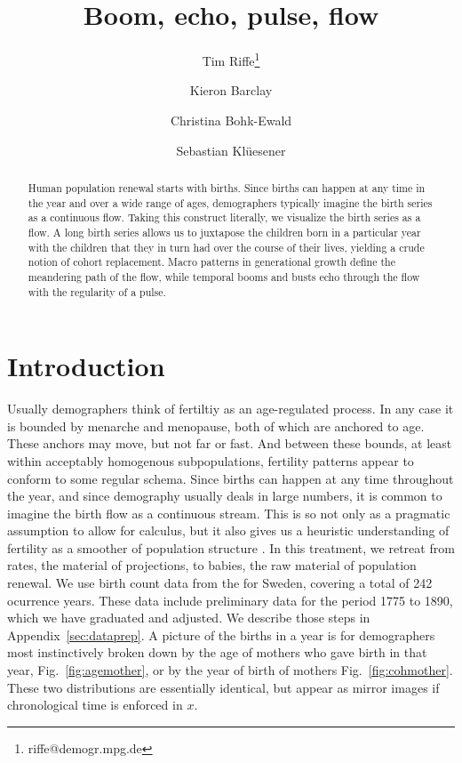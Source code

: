 \documentclass{article}
\begin{document}
\title{Boom, echo, pulse, flow}
\author[1]{Tim Riffe\thanks{riffe@demogr.mpg.de}}
\author[1]{Kieron Barclay}
\author[1]{Christina Bohk-Ewald}
\author[2]{Sebastian Kl\"uesener}
\maketitle

\begin{abstract}
Human population renewal starts with births. Since births can happen at any
time in the year and over a wide range of ages, demographers typically imagine
the birth series as a continuous flow. Taking this construct literally, we
visualize the birth series as a flow. A long birth series allows us to
juxtapose the children born in a particular year with the children that
they in turn had over the course of their lives, yielding a crude notion of
cohort replacement. Macro patterns in generational growth define the meandering
path of the flow, while temporal booms and busts echo through the flow with the
regularity of a pulse.
\end{abstract}

\onehalfspacing
\section{Introduction}
Usually demographers think of fertiltiy as an age-regulated process. In any case it is
bounded by menarche and menopause, both of which are anchored to age. These anchors may
move, but not far or fast. And between these bounds, at least within acceptably homogenous subpopulations, fertility patterns appear to conform to some regular schema. Since births can happen at any time throughout the year, and since demography usually deals in large numbers, it is common to imagine the birth flow as a continuous stream. This is so not only as a pragmatic assumption to allow for calculus, but it also gives us a heuristic understanding of fertility as a smoother of population structure \citep{arthur1982ergodic}. In this treatment, we retreat from rates, the material of projections, to babies, the raw material of population renewal. We use birth count data from the \citet{HFD} for Sweden, covering a total of 242 ocurrence years. These data include preliminary data for the period 1775 to 1890, which we have graduated and adjusted. We describe those steps in Appendix~\ref{sec:dataprep}. A picture of the births in a year is for demographers most instinctively broken down by the age of mothers who gave birth in that year, Fig.~\ref{fig:agemother}, or by the year of birth of mothers Fig.~\ref{fig:cohmother}. These two distributions are essentially identical, but appear as mirror images if chronological time is enforced in $x$.
\end{document}
